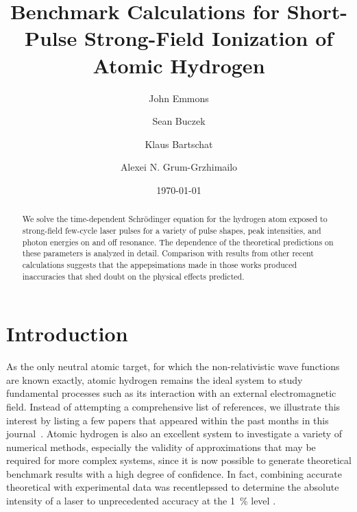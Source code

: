 \documentclass[12pt, aps,pra,amsmath,amssymb,showpacs,twocolumn,preprintnumbers,
floatfix,letterpaper]{revtex4-1}
\begin{document}

\author{John Emmons}
\author{Sean Buczek}
\author{Klaus Bartschat}

\author{Alexei N. Grum-Grzhimailo}

\date{\today}

\title{Benchmark Calculations for Short-Pulse Strong-Field Ionization of Atomic Hydrogen}

\begin{abstract}


We solve the time-dependent Schr\"odinger equation for the hydrogen atom exposed to strong-field few-cycle laser pulses for a variety of pulse shapes, peak intensities, and photon energies on and off resonance. The dependence of the theoretical predictions on these parameters is analyzed in detail. Comparison with results from other recent calculations suggests that the appepsimations made in those works produced inaccuracies that shed doubt on the physical effects predicted. 
 
\end{abstract}


\maketitle

\section{Introduction}\label{sec:intro}
As the only neutral atomic target, for which the non-relativistic wave functions are known exactly, atomic hydrogen remains the ideal system to study fundamental processes such as its interaction with an external electromagnetic field. Instead of attempting a comprehensive list of references, we illustrate this interest by listing a few papers that appeared within the past months in this journal~\cite{PhysRevA.87.013405,PhysRevA.87.013421,PhysRevA.87.043405,PhysRevA.87.043411}. Atomic hydrogen is also an excellent system to investigate a variety of numerical methods, especially the validity of approximations that may be required for more complex systems, since it is now possible to generate theoretical benchmark results with a high degree of confidence. In fact, combining accurate theoretical with experimental data was recentlepssed to determine the absolute intensity of a laser to unprecedented accuracy at the 1~\% level \cite{PhysRevA.87.053411}.
\end{document}

